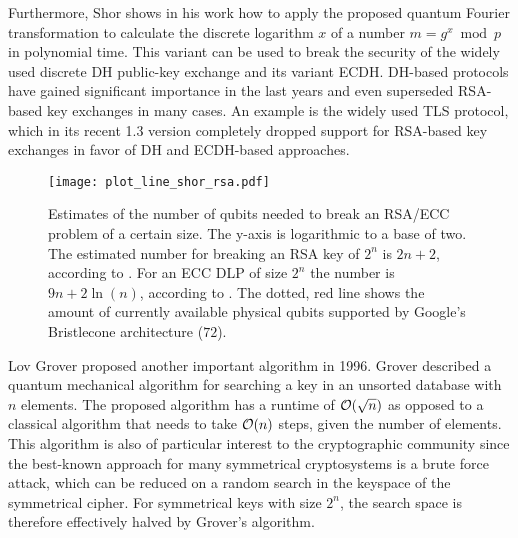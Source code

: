 Furthermore, Shor shows in his work how to apply the proposed quantum Fourier transformation to calculate the discrete logarithm \(x\) of a number \(m = g^x \bmod p\) in polynomial time. This variant can be used to break the security of the widely used discrete \ac{DH} public-key exchange and its variant \ac{ECDH}\cite{shor1999polynomial}. \ac{DH}-based protocols have gained significant importance in the last years and even superseded RSA-based key exchanges in many cases. An example is the widely used TLS protocol, which in its recent 1.3 version completely dropped support for RSA-based key exchanges in favor of \ac{DH} and \ac{ECDH}-based approaches.

\begin{figure}[ht]
    \centering\texttt{[image: plot\_line\_shor\_rsa.pdf]}
    \caption{Estimates of the number of qubits needed to break an RSA/ECC problem of a certain size. The y-axis is logarithmic to a base of two. The estimated number for breaking an RSA key of \(2^n\) is \(2n+2\), according to \cite{haner2017factoring}. For an ECC \ac{DLP} of size \(2^n\) the number is \(9n+2\ln(n)\), according to \cite{roetteler2017quantum}. The dotted, red line shows the amount of currently available physical qubits supported by Google's Bristlecone architecture (\(72\)).}\label{fig:shor_vs_rsa_dlog}
\end{figure}


Lov Grover proposed another important algorithm in 1996\cite{grover1996fast}. Grover described a quantum mechanical algorithm for searching a key in an unsorted database with \(n \) elements. The proposed algorithm has a runtime of \(\mathcal{O}(\sqrt{n})\) as opposed to a classical algorithm that needs to take \(\mathcal{O}(n)\) steps, given the number of elements. This algorithm is also of particular interest to the cryptographic community since the best-known approach for many symmetrical cryptosystems is a brute force attack, which can be reduced on a random search in the keyspace of the symmetrical cipher. For symmetrical keys with size \(2^n \), the search space is therefore effectively halved by Grover's algorithm.


